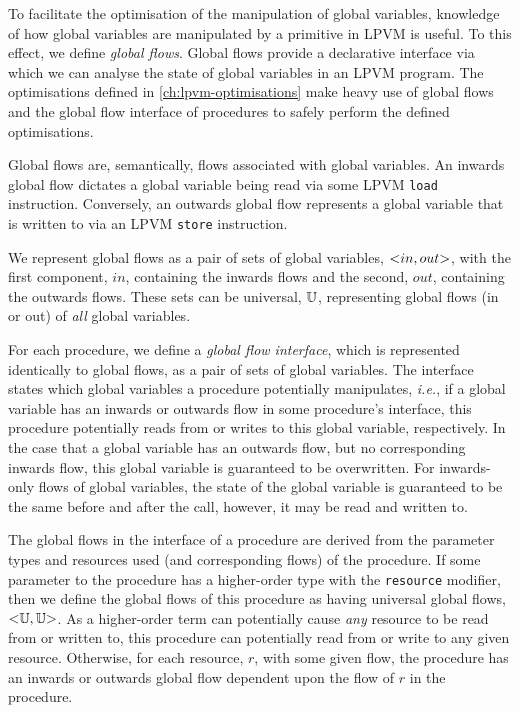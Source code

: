 To facilitate the optimisation of the manipulation of global variables, knowledge of how global variables are manipulated by a primitive in LPVM is useful. To this effect, we define \textit{global flows}. Global flows provide a declarative interface via which we can analyse the state of global variables in an LPVM program. The optimisations defined in \cref{ch:lpvm-optimisations} make heavy use of global flows and the global flow interface of procedures to safely perform the defined optimisations.

Global flows are, semantically, flows associated with global variables. An inwards global flow dictates a global variable being read via some LPVM \texttt{load} instruction. Conversely, an outwards global flow represents a global variable that is written to via an LPVM \texttt{store} instruction.

We represent global flows as a pair of sets of global variables, $\mathtt{<}in, out\mathtt{>}$, with the first component, $in$, containing the inwards flows and the second, $out$, containing the outwards flows. These sets can be universal, $\mathbb{U}$, representing global flows (in or out) of \textit{all} global variables.

For each procedure, we define a \textit{global flow interface}, which is represented identically to global flows, as a pair of sets of global variables. The interface states which global variables a procedure potentially manipulates, \textit{i.e.}, if a global variable has an inwards or outwards flow in some procedure's interface, this procedure potentially reads from or writes to this global variable, respectively. In the case that a global variable has an outwards flow, but no corresponding inwards flow, this global variable is guaranteed to be overwritten. For inwards-only flows of global variables, the state of the global variable is guaranteed to be the same before and after the call, however, it may be read and written to.

The global flows in the interface of a procedure are derived from the parameter types and resources used (and corresponding flows) of the procedure. If some parameter to the procedure has a higher-order type with the \texttt{resource} modifier, then we define the global flows of this procedure as having universal global flows, $\mathtt{<}\mathbb{U}, \mathbb{U}\mathtt{>}$. As a higher-order term can potentially cause \textit{any} resource to be read from or written to, this procedure can potentially read from or write to any given resource. Otherwise, for each resource, $r$, with some given flow, the procedure has an inwards or outwards global flow dependent upon the flow of $r$ in the procedure.

